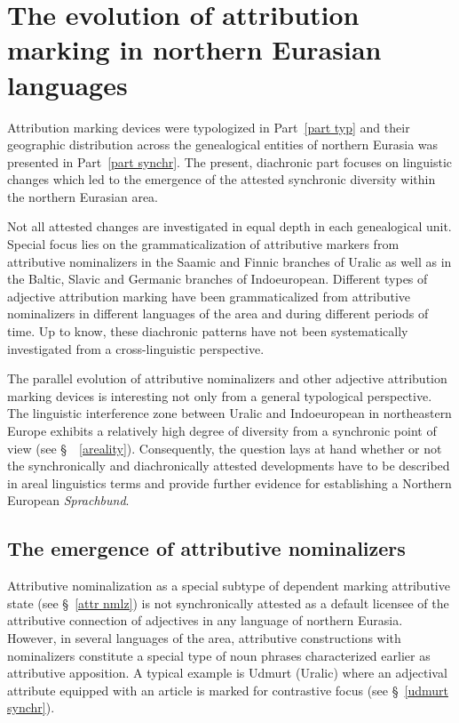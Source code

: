 
\chapter[The evolution of attribution marking]{The evolution of attribution marking in northern Eurasian languages}
Attribution marking devices were typologized in Part~\ref{part typ} and their geographic distribution across the genealogical entities of northern Eurasia was presented in Part~\ref{part synchr}. The present, diachronic part focuses on linguistic changes which led to the emergence of the attested synchronic diversity within the northern Eurasian area.

Not all attested changes are investigated in equal depth in each genealogical unit. Special focus lies on the grammaticalization of attributive markers from attributive nominalizers in the Saamic and Finnic branches of Uralic as well as in the Baltic, Slavic and Germanic branches of Indoeuropean. Different types of adjective attribution marking have been grammaticalized from attributive nominalizers in different languages of the area and during different periods of time. Up to know, these diachronic patterns have not been systematically investigated from a cross-linguistic perspective.

The parallel evolution of attributive nominalizers and other adjective attribution marking devices is interesting not only from a general typological perspective. The linguistic interference zone between Uralic and Indoeuropean in northeastern Europe exhibits a relatively high degree of diversity from a synchronic point of view (see \S~~\ref{areality}). Consequently, the question lays at hand whether or not the synchronically and diachronically attested developments have to be described in areal linguistics terms and provide further evidence for establishing a Northern European \textit{Sprachbund}.

\section[Attributive nominalizers]{The emergence of attributive nominalizers}
Attributive nominalization as a special subtype of dependent marking attributive state (see \S~\ref{attr nmlz}) is not synchronically attested as a default licensee of the attributive connection of adjectives in any language of northern Eurasia. However, in several languages of the area, attributive constructions with nominalizers constitute a special type of noun phrases characterized earlier as attributive apposition. A typical example is Udmurt (Uralic) where an adjectival attribute equipped with an article is marked for contrastive focus (see \S~\ref{udmurt synchr}).

